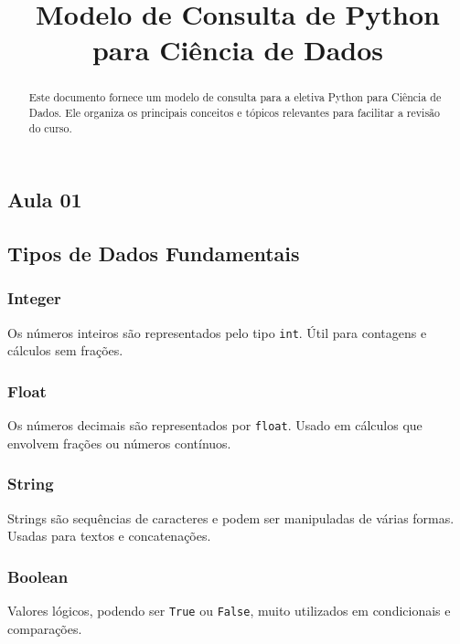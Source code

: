 \documentclass{sciposter}
\title{Modelo de Consulta de Python para Ciência de Dados}
\institute 
{Bacharelado em Economia\\
Insper - Instituto de Ensino e Pesquisa\\
São Paulo, Brasil}
\begin{document}

\maketitle

\begin{multicols}{3}

\begin{abstract}
Este documento fornece um modelo de consulta para a eletiva Python para Ciência de Dados. Ele organiza os principais conceitos e tópicos relevantes para facilitar a revisão do curso.
\end{abstract}

\section{Aula 01}

\subsection{Tipos de Dados Fundamentais}

\subsubsection{Integer}
Os números inteiros são representados pelo tipo \texttt{int}. Útil para contagens e cálculos sem frações.

\subsubsection{Float}
Os números decimais são representados por \texttt{float}. Usado em cálculos que envolvem frações ou números contínuos.

\subsubsection{String}
Strings são sequências de caracteres e podem ser manipuladas de várias formas. Usadas para textos e concatenações.

\subsubsection{Boolean}
Valores lógicos, podendo ser \texttt{True} ou \texttt{False}, muito utilizados em condicionais e comparações.


\end{multicols}
\end{document}
